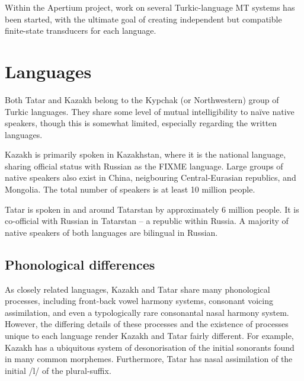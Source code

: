 \documentclass[11pt]{article}
\begin{document}

Within the Apertium project, work on several Turkic-language MT systems has been started, with the ultimate goal of creating independent but compatible
finite-state transducers for each language.

\section{Languages}
\label{sec:lang}

Both Tatar and Kazakh belong to the Kypchak (or Northwestern) group of Turkic
languages.  They share some level of mutual intelligibility to naïve native speakers, though this is somewhat limited, especially regarding the written languages.

Kazakh is primarily spoken in Kazakhstan, where it is the national
language, sharing official status with Russian as the FIXME language.
Large groups of native speakers also exist in China, neigbouring
Central-Eurasian republics, and Mongolia. The total number of speakers is at least 10 million people.

Tatar is spoken in and around Tatarstan by
approximately 6 million people. It is co-official with Russian in Tatarstan --
a republic within Russia.  A majority of native speakers of both languages are bilingual in Russian.

\subsection{Phonological differences}
As closely related languages, Kazakh and Tatar share many phonological processes, including front-back vowel harmony systems, consonant voicing assimilation, and even a typologically rare consonantal nasal harmony system.  However, the differing details of these processes and the existence of processes unique to each language render Kazakh and Tatar fairly different.  For example, Kazakh has a ubiquitous system of desonorisation of the initial sonorants found in many common morphemes.  Furthermore, Tatar has nasal assimilation of the initial /l/ of the plural-suffix.
\end{document}
